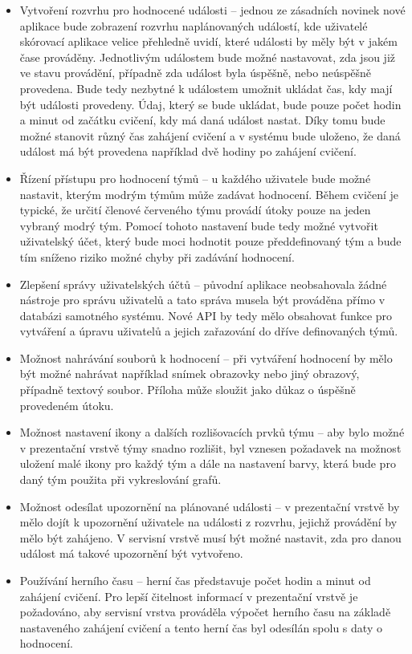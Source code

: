 \documentclass[
  digital,
  twoside,
  table, 
  nolof, 
  nolot
]{fithesis3}
\begin{document}
\begin{itemize}
\item Vytvoření rozvrhu pro hodnocené události -- jednou ze zásadních novinek nové aplikace bude zobrazení rozvrhu naplánovaných událostí, kde uživatelé skórovací aplikace velice přehledně uvidí, které události by měly být v jakém čase prováděny. Jednotlivým událostem bude možné nastavovat, zda jsou již ve stavu provádění, případně zda událost byla úspěšně, nebo neúspěšně provedena. Bude tedy nezbytné k událostem umožnit ukládat čas, kdy mají být události provedeny. Údaj, který se bude ukládat, bude pouze počet hodin a minut od začátku cvičení, kdy má daná událost nastat. Díky tomu bude možné stanovit různý čas zahájení cvičení a v systému bude uloženo, že daná událost má být provedena například dvě hodiny po zahájení cvičení.
\item Řízení přístupu pro hodnocení týmů -- u každého uživatele bude možné nastavit, kterým modrým týmům může zadávat hodnocení. Během cvičení je typické, že určití členové červeného týmu provádí útoky pouze na jeden vybraný modrý tým. Pomocí tohoto nastavení bude tedy možné vytvořit uživatelský účet, který bude moci hodnotit pouze předdefinovaný tým a bude tím sníženo riziko možné chyby při zadávání hodnocení.
\item Zlepšení správy uživatelských účtů -- původní aplikace neobsahovala žádné nástroje pro správu uživatelů a tato správa musela být prováděna přímo v databázi samotného systému. Nové API by tedy mělo obsahovat funkce pro vytváření a úpravu uživatelů a jejich zařazování do dříve definovaných týmů.
\item Možnost nahrávání souborů k hodnocení – při vytváření hodnocení by mělo být možné nahrávat například snímek obrazovky nebo jiný obrazový, případně textový soubor. Příloha může sloužit jako důkaz o úspěšně provedeném útoku.
\item Možnost nastavení ikony a dalších rozlišovacích prvků týmu -- aby bylo možné v prezentační vrstvě týmy snadno rozlišit, byl vznesen požadavek na možnost uložení malé ikony pro každý tým a dále na nastavení barvy, která bude pro daný tým použita při vykreslování grafů.
\item Možnost odesílat upozornění na plánované události -- v prezentační vrstvě by mělo dojít k upozornění uživatele na události z rozvrhu, jejichž provádění by mělo být zahájeno. V servisní vrstvě musí být možné nastavit, zda pro danou událost má takové upozornění být vytvořeno.
\item Používání herního času -- herní čas představuje počet hodin a minut od zahájení cvičení. Pro lepší čitelnost informací v prezentační vrstvě je požadováno, aby servisní vrstva prováděla výpočet herního času na základě nastaveného zahájení cvičení a tento herní čas byl odesílán spolu s daty o hodnocení.
\end{itemize}
\end{document}
